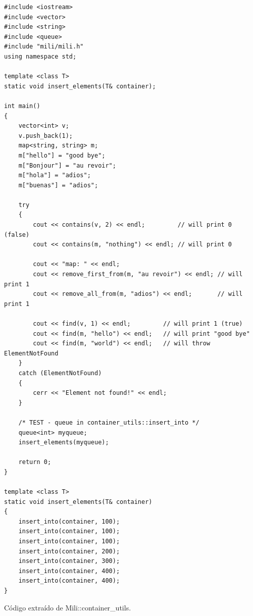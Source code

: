 \begin{table}[!htb]
    \lstset{language=C++}
    \begin{lstlisting}[frame=single]
#include <iostream>
#include <vector>
#include <string>
#include <queue>
#include "mili/mili.h"
using namespace std;

template <class T>
static void insert_elements(T& container);

int main()
{
    vector<int> v;
    v.push_back(1);
    map<string, string> m;
    m["hello"] = "good bye";
    m["Bonjour"] = "au revoir";
    m["hola"] = "adios";
    m["buenas"] = "adios";

    try
    {
        cout << contains(v, 2) << endl;         // will print 0 (false)
        cout << contains(m, "nothing") << endl; // will print 0

        cout << "map: " << endl;
        cout << remove_first_from(m, "au revoir") << endl; // will print 1
        cout << remove_all_from(m, "adios") << endl;       // will print 1

        cout << find(v, 1) << endl;         // will print 1 (true)
        cout << find(m, "hello") << endl;   // will print "good bye"
        cout << find(m, "world") << endl;   // will throw ElementNotFound
    }
    catch (ElementNotFound)
    {
        cerr << "Element not found!" << endl;
    }

    /* TEST - queue in container_utils::insert_into */
    queue<int> myqueue;
    insert_elements(myqueue);

    return 0;
}

template <class T>
static void insert_elements(T& container)
{
    insert_into(container, 100);
    insert_into(container, 100);
    insert_into(container, 100);
    insert_into(container, 200);
    insert_into(container, 300);
    insert_into(container, 400);
    insert_into(container, 400);
}
    \end{lstlisting}
    \centering \caption{C\'odigo extra\'ido de Mili::container\_utils.}
\end{table}
